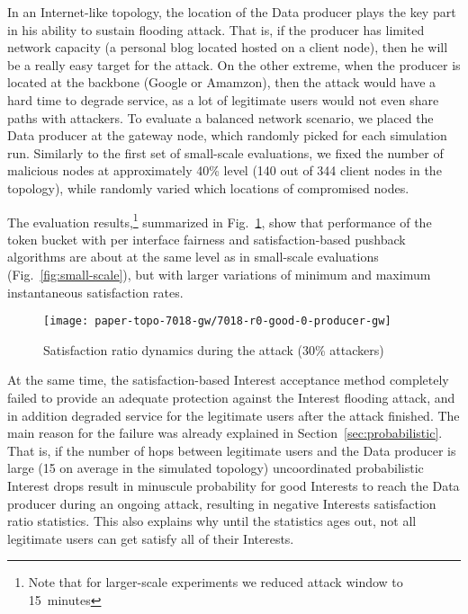 In an Internet-like topology, the location of the Data producer plays the key part in his ability to sustain flooding attack.
That is, if the producer has limited network capacity (a personal blog located hosted on a client node), then he will be a really easy target for the attack.
On the other extreme, when the producer is located at the backbone (Google or Amamzon), then the attack would have a hard time to degrade service, as a lot of legitimate users would not even share paths with attackers.
To evaluate a balanced network scenario, we placed the Data producer at the gateway node, which randomly picked for each simulation run.
Similarly to the first set of small-scale evaluations, we fixed the number of malicious nodes at approximately 40\% level (140 out of 344 client nodes in the topology), while randomly varied which locations of compromised nodes.


The evaluation results,\footnote{Note that for larger-scale experiments we reduced attack window to 15~minutes} summarized in Fig.~\ref{fig:large-scale}, show that performance of the token bucket with per interface fairness and satisfaction-based pushback algorithms are about at the same level as in small-scale evaluations (Fig.~\ref{fig:small-scale}), but with larger variations of minimum and maximum instantaneous satisfaction rates.

\begin{figure}[tbh]
 \centering
 \texttt{[image: paper-topo-7018-gw/7018-r0-good-0-producer-gw]}
 \caption{Satisfaction ratio dynamics during the attack (30\% attackers)}
 \label{fig:large-scale}
\end{figure}

At the same time, the satisfaction-based Interest acceptance method completely failed to provide an adequate protection against the Interest flooding attack, and in addition degraded service for the legitimate users after the attack finished.
The main reason for the failure was already explained in Section~\ref{sec:probabilistic}.
That is, if the number of hops between legitimate users and the Data producer is large (15 on average in the simulated topology) uncoordinated probabilistic Interest drops result in minuscule probability for good Interests to reach the Data producer during an ongoing attack, resulting in negative Interests satisfaction ratio statistics.
This also explains why until the statistics ages out, not all legitimate users can get satisfy all of their Interests.

